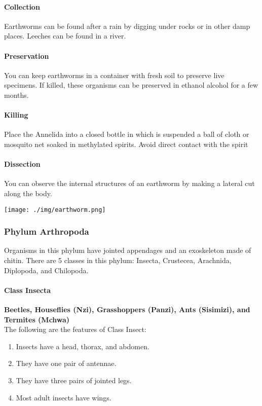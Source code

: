 \begin{multicols}{2}
\paragraph{Collection}
Earthworms can be found after a rain by digging under rocks or in other damp places. Leeches can be found in a river.

\paragraph{Preservation} 
You can keep earthworms in a container with fresh soil to preserve live specimens. If killed, these organisms can be preserved in ethanol alcohol for a few months. 

\paragraph{Killing}
Place the Annelida into a closed bottle in which is suspended a ball of cloth or mosquito net soaked in methylated spirits. Avoid direct contact with the spirit

\paragraph{Dissection}
You can observe the internal structures of an earthworm by making a lateral cut along the body.

\begin{center}
\texttt{[image: ./img/earthworm.png]}
\end{center}

%

\subsubsection{Phylum Arthropoda}
Organisms in this phylum have jointed appendages and an exoskeleton made of chitin. There are 5 classes in this phylum: Insecta, Crustecea, Arachnida, Diplopoda, and Chilopoda.

\setcounter{secnumdepth}{4}

\paragraph{Class Insecta}
\textbf{Beetles, Houseflies (Nzi), Grasshoppers (Panzi), Ants (Sisimizi), and Termites (Mchwa)}\\
The following are the features of Class Insect:
\begin{enumerate}
\item{Insects have a head, thorax, and abdomen.}
\item{They have one pair of antennae.}
\item{They have three pairs of jointed legs.}
\item{Most adult insects have wings.}
\end{enumerate}


\end{multicols}
